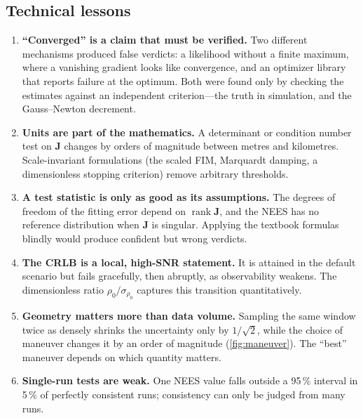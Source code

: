 \documentclass[11pt,a4paper]{article}
\newcommand{\J}{\bm{J}}
\DeclareMathOperator{\rank}{rank}
\theoremstyle{plain}
\theoremstyle{remark}
\begin{document}
\subsection{Technical lessons}
\begin{enumerate}[leftmargin=*]
\item \textbf{``Converged'' is a claim that must be verified.} Two different
  mechanisms produced false verdicts: a likelihood without a finite maximum,
  where a vanishing gradient looks like convergence, and an optimizer library
  that reports failure at the optimum. Both were found only by checking the
  estimates against an independent criterion---the truth in simulation, and
  the Gauss--Newton decrement.
\item \textbf{Units are part of the mathematics.} A determinant or condition
  number test on $\J$ changes by orders of magnitude between metres and
  kilometres. Scale-invariant formulations (the scaled FIM, Marquardt
  damping, a dimensionless stopping criterion) remove arbitrary thresholds.
\item \textbf{A test statistic is only as good as its assumptions.} The
  degrees of freedom of the fitting error depend on $\rank\J$, and the NEES
  has no reference distribution when $\J$ is singular. Applying the textbook
  formulas blindly would produce confident but wrong verdicts.
\item \textbf{The CRLB is a local, high-SNR statement.} It is attained in the
  default scenario but fails gracefully, then abruptly, as observability
  weakens. The dimensionless ratio $\rho_0/\sigma_{\rho_0}$ captures this
  transition quantitatively.
\item \textbf{Geometry matters more than data volume.} Sampling the same
  window twice as densely shrinks the uncertainty only by $1/\sqrt2$, while
  the choice of maneuver changes it by an order of magnitude
  (\cref{fig:maneuver}). The ``best'' maneuver depends on which quantity
  matters.
\item \textbf{Single-run tests are weak.} One NEES value falls outside a
  95\,\% interval in 5\,\% of perfectly consistent runs; consistency can only
  be judged from many runs.
\end{enumerate}
\end{document}
